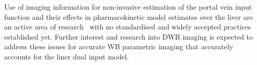 Use of imaging information for non-invasive estimation of the portal vein input function and their effects in pharmacokinetic model estimates over the liver are an active area of research~\cite{Wang2018,HernandezLozano2019,Wang2021} with no standardised and widely accepted practices established yet. Further interest and research into DWB imaging is expected to address these issues for accurate WB parametric imaging that accurately accounts for the liner dual input model.  


